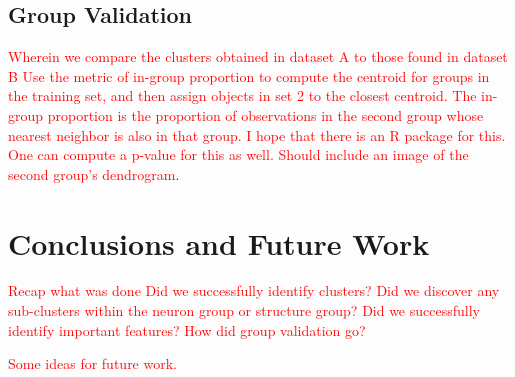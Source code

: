 \documentclass[10pt]{article}
\newcommand{\todo}[1]{\textcolor{red}{#1}}
\begin{document}
\subsection{Group Validation}

\todo{Wherein we compare the clusters obtained in dataset A to those found in dataset B}
\todo{Use the metric of in-group proportion to compute the centroid for groups in the training set, and then assign objects in set 2 to the closest centroid. The in-group proportion is the proportion of observations in the second group whose nearest neighbor is also in that group. I hope that there is an R package for this.}
\todo{One can compute a p-value for this as well.}
\todo{Should include an image of the second group's dendrogram}.

\section{Conclusions and Future Work}

\todo{Recap what was done}
\todo{Did we successfully identify clusters?}
\todo{Did we discover any sub-clusters within the neuron group or structure group?}
\todo{Did we successfully identify important features?}
\todo{How did group validation go?}

\todo{Some ideas for future work.}


\printbibliography
\end{document}

